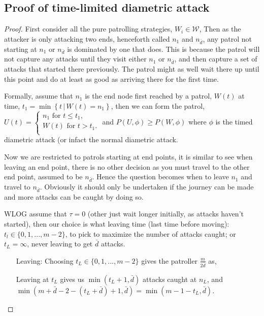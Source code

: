 \documentclass[a4paper,10pt]{article}
\newcommand{\set}[2]{\left\{ #1 \, | \, #2 \right\}}
\theoremstyle{definition}
\theoremstyle{definition}
\theoremstyle{remark}
\theoremstyle{definition}
\begin{document}
\subsection{Proof of time-limited diametric attack}
\label{Appendix:Proof of time-limited diametric attack}

\begin{proof}
First consider all the pure patrolling strategies, $W_{i} \in \mathcal{W}$, Then as the attacker is only attacking two ends, henceforth called $n_{1}$ and $n_{\bar{d}}$, any patrol not starting at $n_{1}$ or $n_{\bar{d}}$ is dominated by one that does.
This is because the patrol will not capture any attacks until they visit either $n_{1}$ or $n_{\bar{d}}$, and then capture a set of attacks that started there previously. The patrol might as well wait there up until this point and do at least as good as arriving there for the first time.

Formally, assume that $n_{1}$ is the end node first reached by a patrol, $W(t)$ at time, $t_{1}=\min \set{t}{W(t)=n_{1}}$, then we can form the patrol, $U(t)= \left\{ \begin{array}{l}
n_{1} \text{ for } t \leq t_{1}, \\
W(t) \text{ for } t>t_{1}. \\
\end{array} \right.$
and $P(U,\phi) \geq P(W,\phi)$ where $\phi$ is the timed diametric attack (or infact the normal diametric attack.

Now we are restricted to patrols starting at end points, it is similar to see when leaving an end point, there is no other decision as you must travel to the other end point, assumed to be $n_{\bar{d}}$. Hence the question becomes when to leave $n_{1}$ and travel to $n_{\bar{d}}$. Obviously it should only be undertaken if the journey can be made and more attacks can be caught by doing so.

WLOG assume that $\tau=0$ (other just wait longer initially, as attacks haven't started), then our choice is what leaving time (last time before moving): $t_{l} \in \{0,1,...,m-2 \}$, to pick to maximize the number of attacks caught; or $t_{L}=\infty$, never leaving to get $\bar{d}$ attacks.

\begin{itemize}
\item[Leaving:]Choosing $t_{L} \in \{0,1,...,m-2 \}$ gives the patroller $\frac{m}{2\bar{d}}$ as,

Leaving at $t_{L}$ gives us $\min(t_{L}+1,\bar{d})$ attacks caught at $n_{L}$, and $\min(m+\bar{d}-2-(t_{L}+\bar{d})+1,\bar{d})=\min(m-1-t_{L},\bar{d})$.


\end{itemize}
\end{proof}
\end{document}
